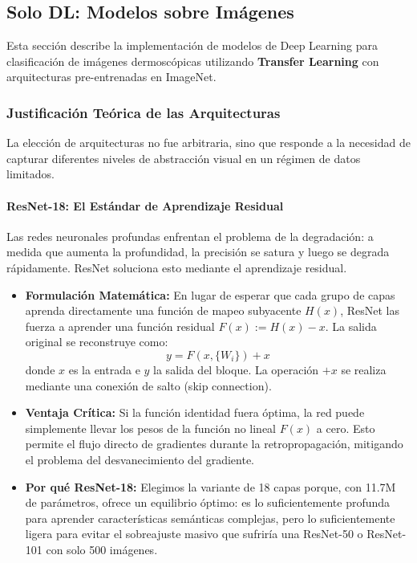 \documentclass[12pt,a4paper]{article}
\begin{document}
\newpage

\subsection{Solo DL: Modelos sobre Imágenes}
\label{sec:solo_dl}

Esta sección describe la implementación de modelos de Deep Learning para clasificación de imágenes dermoscópicas utilizando \textbf{Transfer Learning} con arquitecturas pre-entrenadas en ImageNet.

\subsubsection{Justificación Teórica de las Arquitecturas}

La elección de arquitecturas no fue arbitraria, sino que responde a la necesidad de capturar diferentes niveles de abstracción visual en un régimen de datos limitados.

\paragraph{ResNet-18: El Estándar de Aprendizaje Residual}
Las redes neuronales profundas enfrentan el problema de la degradación: a medida que aumenta la profundidad, la precisión se satura y luego se degrada rápidamente. ResNet \cite{he_deep_2015} soluciona esto mediante el aprendizaje residual.
\begin{itemize}
    \item \textbf{Formulación Matemática:} En lugar de esperar que cada grupo de capas aprenda directamente una función de mapeo subyacente $H(x)$, ResNet las fuerza a aprender una función residual $F(x) := H(x) - x$. La salida original se reconstruye como:
    \begin{equation}
        y = F(x, \{W_i\}) + x
    \end{equation}
    donde $x$ es la entrada e $y$ la salida del bloque. La operación $+x$ se realiza mediante una conexión de salto (skip connection).
    \item \textbf{Ventaja Crítica:} Si la función identidad fuera óptima, la red puede simplemente llevar los pesos de la función no lineal $F(x)$ a cero. Esto permite el flujo directo de gradientes durante la retropropagación, mitigando el problema del desvanecimiento del gradiente.
    \item \textbf{Por qué ResNet-18:} Elegimos la variante de 18 capas porque, con 11.7M de parámetros, ofrece un equilibrio óptimo: es lo suficientemente profunda para aprender características semánticas complejas, pero lo suficientemente ligera para evitar el sobreajuste masivo que sufriría una ResNet-50 o ResNet-101 con solo 500 imágenes.
\end{itemize}
\end{document}

